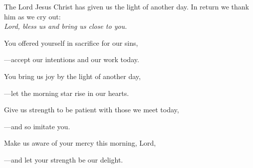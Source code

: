 \intercessions\indent

\begin{hangpar}

The Lord Jesus Christ has given us the light of another day. In return we thank him as we cry out:\\
\emph{Lord, bless us and bring us close to you.}

\medskip You offered yourself in sacrifice for our sins,

{\color{red}---\thinspace}accept our intentions and our work today.

\medskip You bring us joy by the light of another day,

{\color{red}---\thinspace}let the morning star rise in our hearts.

\medskip Give us strength to be patient with those we meet today,

{\color{red}---\thinspace}and so imitate you.

\medskip Make us aware of your mercy this morning, Lord,

{\color{red}---\thinspace}and let your strength be our delight.

\end{hangpar}


